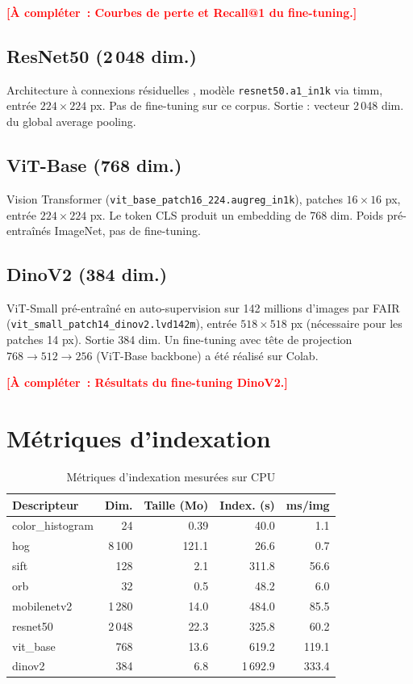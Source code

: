 \documentclass[12pt,a4paper]{report}
\newcommand{\todo}[1]{\textcolor{red}{\textbf{[À compléter~: #1]}}}
\begin{document}
\todo{Courbes de perte et Recall@1 du fine-tuning.}

\subsection*{ResNet50 (2\,048 dim.)}

Architecture à connexions résiduelles \cite{he2016}, modèle \texttt{resnet50.a1\_in1k} via timm, entrée $224 \times 224$ px. Pas de fine-tuning sur ce corpus. Sortie : vecteur 2\,048 dim. du global average pooling.

\subsection*{ViT-Base (768 dim.)}

Vision Transformer \cite{dosovitskiy2020} (\texttt{vit\_base\_patch16\_224.augreg\_in1k}), patches $16 \times 16$ px, entrée $224 \times 224$ px. Le token CLS produit un embedding de 768 dim. Poids pré-entraînés ImageNet, pas de fine-tuning.

\subsection*{DinoV2 (384 dim.)}

ViT-Small pré-entraîné en auto-supervision sur 142 millions d'images par FAIR \cite{oquab2023} (\texttt{vit\_small\_patch14\_dinov2.lvd142m}), entrée $518 \times 518$ px (nécessaire pour les patches 14 px). Sortie 384 dim. Un fine-tuning avec tête de projection $768 \to 512 \to 256$ (ViT-Base backbone) a été réalisé sur Colab.

\todo{Résultats du fine-tuning DinoV2.}

\section{Métriques d'indexation}

\begin{table}[H]
  \centering
  \begin{tabular}{lrrrr}
    \toprule
    Descripteur & Dim. & Taille (Mo) & Index. (s) & ms/img \\
    \midrule
    color\_histogram & 24      & 0.39   & 40.0    & 1.1   \\
    hog              & 8\,100  & 121.1  & 26.6    & 0.7   \\
    sift             & 128     & 2.1    & 311.8   & 56.6  \\
    orb              & 32      & 0.5    & 48.2    & 6.0   \\
    mobilenetv2      & 1\,280  & 14.0   & 484.0   & 85.5  \\
    resnet50         & 2\,048  & 22.3   & 325.8   & 60.2  \\
    vit\_base        & 768     & 13.6   & 619.2   & 119.1 \\
    dinov2           & 384     & 6.8    & 1\,692.9 & 333.4 \\
    \bottomrule
  \end{tabular}
  \caption{Métriques d'indexation mesurées sur CPU}
  \label{tab:indexing}
\end{table}
\end{document}
